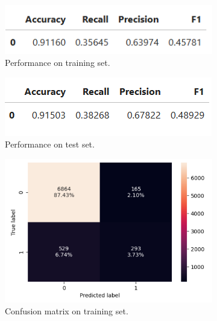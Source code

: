 \documentclass[12pt,a4paper]{article}
\begin{document}
	\begin{figure}[h]
		\centering
		\begin{subfigure}[t]{0.49\textwidth}
			\includegraphics[width=\textwidth]{lg_base_train_perf.png}
			\caption{Performance on training set.}
			\label{fig:lg_base_train_perf}
		\end{subfigure}
		\hfill
		\begin{subfigure}[t]{0.49\textwidth}
			\includegraphics[width=\textwidth]{lg_base_test_perf.png}
			\caption{Performance on test set.}
			\label{fig:lg_base_test_per}
		\end{subfigure}
		\begin{subfigure}[t]{0.5\textwidth}
			\includegraphics[width=\textwidth]{lg_base_c_Matrix_train.png}
			\caption{Confusion matrix on training set.}
			\label{fig:lg_base_c_Matrix_train}
		\end{subfigure}
		\hfill
		\begin{subfigure}[t]{0.45\textwidth}

\end{subfigure}
\end{figure}
\end{document}
